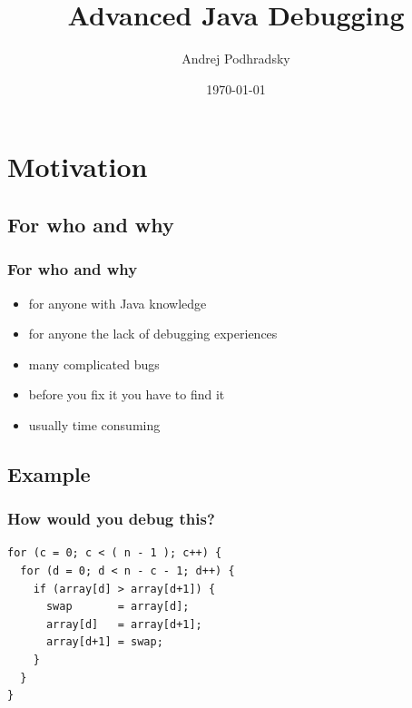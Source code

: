 \documentclass{beamer}
\begin{document}
\title{Advanced Java Debugging}   
\author{Andrej Podhradsky}
\date{\today} 



\frame{\titlepage} 


\section{Motivation}

\subsection{For who and why}
\begin{frame}[fragile]
\frametitle{For who and why}
\begin{itemize}
\item for anyone with Java knowledge
\item for anyone the lack of debugging experiences
\end{itemize}
\begin{itemize}
\item many complicated bugs
\item before you fix it you have to find it
\item usually time consuming
\end{itemize}
\end{frame}

\subsection{Example}
\begin{frame}[fragile]
\frametitle{How would you debug this?}
\begin{lstlisting}
for (c = 0; c < ( n - 1 ); c++) {
  for (d = 0; d < n - c - 1; d++) {
    if (array[d] > array[d+1]) {
      swap       = array[d];
      array[d]   = array[d+1];
      array[d+1] = swap;
    }
  }
}
\end{lstlisting}
\end{frame}
\end{document}
